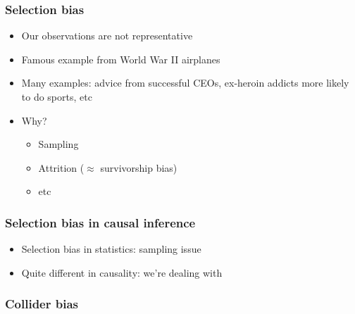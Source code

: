 \begin{frame}
\frametitle{Selection bias}\label{selectbias}
\centering

\begin{itemize}
  \item Our observations are not representative
  \item Famous example from World War II airplanes
  \item Many examples: advice from successful CEOs, ex-heroin addicts more likely to do sports, etc
  \item Why?
  \begin{itemize}
    \item Sampling
    \item Attrition ($\approx$ survivorship bias)
    \item etc
  \end{itemize}
\end{itemize}

\end{frame}
\note{}
\begin{frame}
\frametitle{Selection bias in causal inference}
\centering

\begin{itemize}
  \item Selection bias in statistics: sampling issue
  \item Quite different in causality: we're dealing with 
\end{itemize}

\end{frame}
\note{}

\begin{frame}
\frametitle{Collider bias}\label{collider}
\centering


\end{frame}
\note{}

